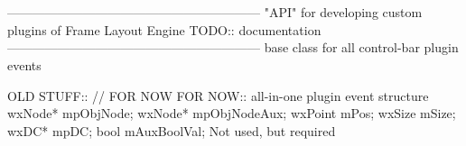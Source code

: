 %
%


\section{}\label{cbpluginevent}


------------------------------------------------------------
   "API" for developing custom plugins of Frame Layout Engine
   TODO:: documentation
  ------------------------------------------------------------
 base class for all control-bar plugin events






\label{cbplugineventcbpluginevent}



\label{cbplugineventclone}


OLD STUFF::
	// FOR NOW FOR NOW:: all-in-one plugin event structure
	wxNode* mpObjNode;
	wxNode* mpObjNodeAux;
	wxPoint mPos;
	wxSize  mSize;
	wxDC*   mpDC;
	bool    mAuxBoolVal;
	Not used, but required

